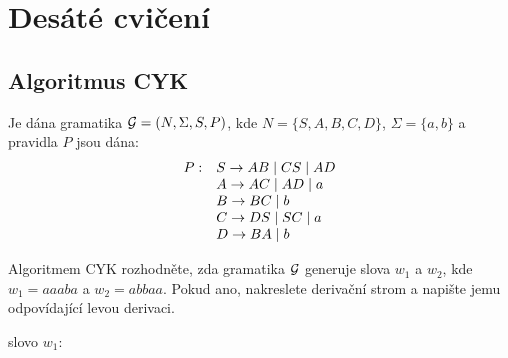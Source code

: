 \section{Desáté cvičení}
 
\subsection{Algoritmus CYK} %

Je dána gramatika $\mathcal{G} = (N, \Sigma, S, P)$, kde 
$N = \{S, A, B, C, D\}$, $\Sigma = \{a, b\}$ a pravidla $P$ jsou dána:
\vspace*{-4mm}
\[
    \begin{array}{l l}
        P: & S \rightarrow AB \mid CS \mid AD \\
           & A \rightarrow AC \mid AD \mid a \\
           & B \rightarrow BC \mid b \\
           & C \rightarrow DS \mid SC \mid a \\
           & D \rightarrow BA \mid b \\
    \end{array}
\]

Algoritmem CYK rozhodněte, zda gramatika $\mathcal{G}$ generuje slova $w_1$ a $w_2$, kde $w_1 = aaaba$ a $w_2 = abbaa$.  
Pokud ano, nakreslete derivační strom a napište jemu odpovídající levou derivaci.
\vspace*{3mm}

slovo $w_1$:

